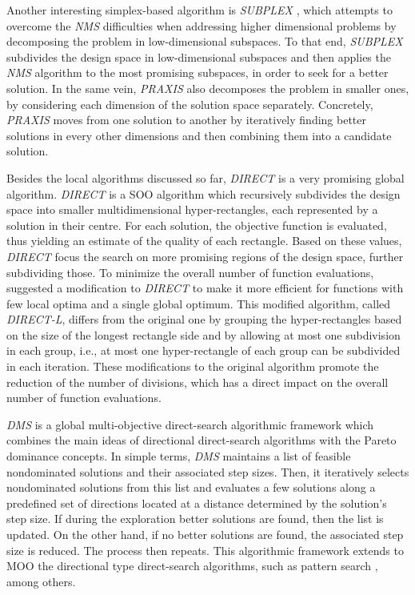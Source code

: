 	Another interesting simplex-based algorithm is \textit{SUBPLEX} \cite{Rowan1990}, which attempts to overcome the \textit{\ac{NMS}} difficulties when addressing higher dimensional problems by decomposing the problem in low\nobreakdash-\hspace{0pt}dimensional
	subspaces. To that end, \textit{SUBPLEX} subdivides the design space in low-dimensional subspaces and then applies the \textit{\ac{NMS}} algorithm to the most promising subspaces, in order to seek for a better solution. %
	In the same vein, \textit{\ac{PRAXIS}} \cite{Brent1973} also decomposes the problem in smaller ones, by considering each dimension of the solution space separately. Concretely, \textit{\ac{PRAXIS}} moves from one solution to another by iteratively finding better solutions in every other dimensions and then combining them into a candidate solution. 
	
	Besides the local algorithms discussed so far, \textit{\ac{DIRECT}} is a very promising global algorithm. \textit{\ac{DIRECT}} \cite{Jones1993DIRECT} is a \ac{SOO} algorithm which recursively subdivides the design space into smaller multidimensional hyper-rectangles, each represented by a solution in their centre. For each solution, the objective function is evaluated, thus yielding an estimate of the quality of each rectangle. Based on these values, \textit{\ac{DIRECT}} focus the search on more promising regions of the design space, further subdividing those. To minimize the overall number of function evaluations, \cite{Gablonsky2001} suggested a modification to \textit{\ac{DIRECT}} to make it more efficient for functions with few local optima and a single global optimum. This modified algorithm, called \textit{\ac{DIRECT}-L}, differs from the original one by grouping the hyper-rectangles based on the size of the longest rectangle side and by allowing at most one subdivision in each group, i.e., at most one hyper-rectangle of each group can be subdivided in each iteration. These modifications to the original algorithm promote the reduction of the number of divisions, which has a direct impact on the overall number of function evaluations.
	
	\textit{\ac{DMS}} \cite{Custodio2010} is a global multi-objective direct-search algorithmic framework which combines the main ideas of directional direct-search algorithms with the Pareto dominance concepts. In simple terms, \textit{\ac{DMS}} maintains a list of feasible nondominated solutions and their associated step sizes. Then, it iteratively selects nondominated solutions from this list and evaluates a few solutions along a predefined set of directions located at a distance determined by the solution's step size. If during the exploration better solutions are found, then the list is updated. On the other hand, if no better solutions are found, the associated step size is reduced. The process then repeats. This algorithmic framework extends to \ac{MOO} the directional type direct-search algorithms, such as pattern search \cite{Kolda2003}, among others. 
	
